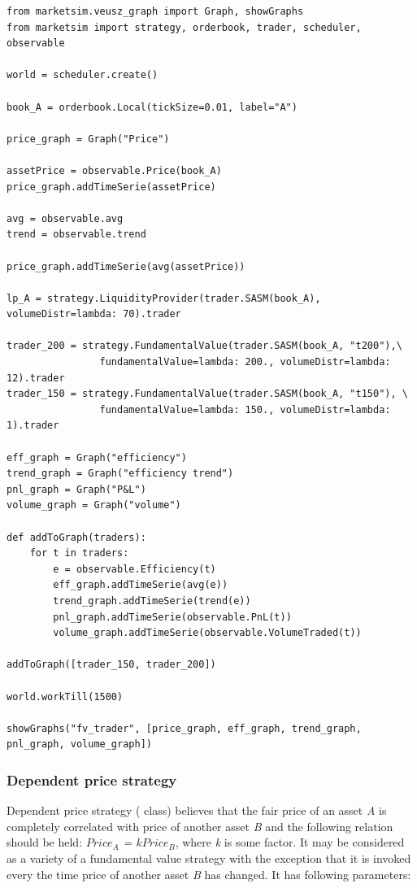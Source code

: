 \documentclass[a4paper,11pt]{article}
\newcommand{\tmtexttt}[1]{{\ttfamily{#1}}}
\begin{document}
\begin{verbatim}
from marketsim.veusz_graph import Graph, showGraphs
from marketsim import strategy, orderbook, trader, scheduler, observable

world = scheduler.create()

book_A = orderbook.Local(tickSize=0.01, label="A")

price_graph = Graph("Price")
 
assetPrice = observable.Price(book_A)
price_graph.addTimeSerie(assetPrice)

avg = observable.avg
trend = observable.trend

price_graph.addTimeSerie(avg(assetPrice))

lp_A = strategy.LiquidityProvider(trader.SASM(book_A), volumeDistr=lambda: 70).trader

trader_200 = strategy.FundamentalValue(trader.SASM(book_A, "t200"),\
                fundamentalValue=lambda: 200., volumeDistr=lambda: 12).trader
trader_150 = strategy.FundamentalValue(trader.SASM(book_A, "t150"), \
                fundamentalValue=lambda: 150., volumeDistr=lambda: 1).trader

eff_graph = Graph("efficiency")
trend_graph = Graph("efficiency trend")
pnl_graph = Graph("P&L")
volume_graph = Graph("volume")

def addToGraph(traders):
    for t in traders:
        e = observable.Efficiency(t)
        eff_graph.addTimeSerie(avg(e))
        trend_graph.addTimeSerie(trend(e))
        pnl_graph.addTimeSerie(observable.PnL(t))
        volume_graph.addTimeSerie(observable.VolumeTraded(t))

addToGraph([trader_150, trader_200])

world.workTill(1500)

showGraphs("fv_trader", [price_graph, eff_graph, trend_graph, pnl_graph, volume_graph])
\end{verbatim}

\subsubsection{Dependent price strategy}

Dependent price strategy (\tmtexttt{strategy.Dependency} class) believes that the fair price of an asset \textit{A} is completely correlated with price of another asset \textit{B} and the following relation should be held: \textit{$Price_{A}$ = $kPrice_B$}, where \textit{k} is some factor. It may be considered as a variety of a fundamental value strategy with the exception that it is invoked every the time price of another asset \textit{B} has changed. It has following parameters: 
\end{document}

